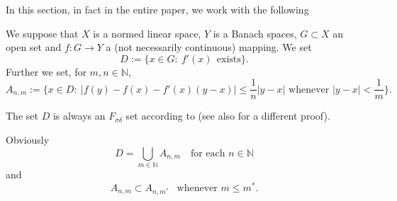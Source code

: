 \documentclass[12pt,a4paper]{amsart}
\theoremstyle{plain}
\theoremstyle{definition}
\theoremstyle{remark}
\numberwithin{equation}{section}
\newcommand{\N}{{\mathbb N}}
\begin{document}
In this section, in fact in the  entire paper, we work with the following  
\vspace{3mm}

 We suppose that  $X$ is a normed linear space,  $Y$ is a Banach  spaces, $G\subset X$ an 
 open set and $f:G \to Y$ a (not necessarily continuous) mapping. 
We set
\begin{equation}\label{D}
D:= \{x\in G:\ f'(x)\ \ \text{exists}\}.
\end{equation}
Further we set, for  $m,n \in \N$,
\begin{equation}\label{ank}
A_{n,m}:= \{x\in D:\ |f(y)-f(x)-f'(x)(y-x)| \leq \frac{1}{n}|y-x| \text{ whenever } |y-x| < \frac{1}{m}\}.
\end{equation}
\vspace{3mm}

The set $D$ is always an $F_{\sigma\delta}$ set according to   \cite[Theorem 2]{Z}  (see also
\cite[Corollary 3.5.5]{LPT}
 for a different proof).

Obviously
\begin{equation}\label{danm}
D= \bigcup_{m\in \N} A_{n,m}\ \ \ \text{ for each } n\in \N
\end{equation}
and
\begin{equation}\label{anm}
A_{n,m} \subset A_{n,m^*}\ \ \text{ whenever } m \leq m^*.
\end{equation}
\end{document}

